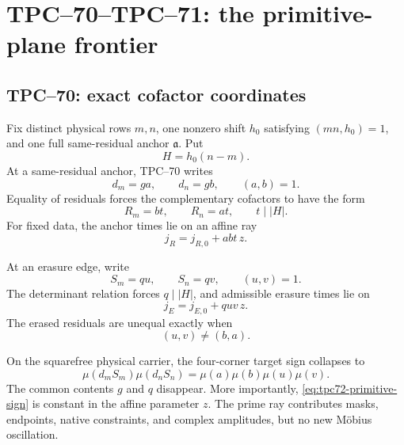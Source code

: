 \section{TPC--70--TPC--71: the primitive-plane frontier}
\label{sec:primitive-frontier}

\subsection{TPC--70: exact cofactor coordinates}

Fix distinct physical rows \(m,n\), one nonzero shift \(h_0\) satisfying
\((mn,h_0)=1\), and one full same-residual anchor \(\mathfrak a\).  Put
\begin{equation}
 H=h_0(n-m).
 \label{eq:tpc72-H}
\end{equation}
At a same-residual anchor, TPC--70 writes
\begin{equation}
 d_m=ga,\qquad d_n=gb,\qquad(a,b)=1.
 \label{eq:tpc72-anchor-primitive}
\end{equation}
Equality of residuals forces the complementary cofactors to have the form
\begin{equation}
 R_m=bt,\qquad R_n=at,\qquad t\mid |H|.
 \label{eq:tpc72-anchor-cofactors}
\end{equation}
For fixed data, the anchor times lie on an affine ray
\begin{equation}
 j_R=j_{R,0}+abt\,z.
 \label{eq:tpc72-anchor-ray}
\end{equation}

At an erasure edge, write
\begin{equation}
 S_m=qu,\qquad S_n=qv,\qquad(u,v)=1.
 \label{eq:tpc72-erasure-primitive}
\end{equation}
The determinant relation forces \(q\mid |H|\), and admissible erasure times
lie on
\begin{equation}
 j_E=j_{E,0}+quv\,z.
 \label{eq:tpc72-erasure-ray}
\end{equation}
The erased residuals are unequal exactly when
\begin{equation}
 (u,v)\ne(b,a).
 \label{eq:tpc72-excluded-anchor}
\end{equation}

On the squarefree physical carrier, the four-corner target sign collapses
to
\begin{equation}
 \mu(d_mS_m)\mu(d_nS_n)
 =
 \mu(a)\mu(b)\mu(u)\mu(v).
 \label{eq:tpc72-primitive-sign}
\end{equation}
The common contents \(g\) and \(q\) disappear.  More importantly,
\eqref{eq:tpc72-primitive-sign} is constant in the affine parameter \(z\).
The prime ray contributes masks, endpoints, native constraints, and complex
amplitudes, but no new M\"obius oscillation.

